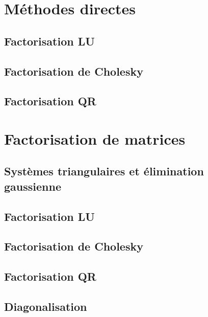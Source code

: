\section{Méthodes directes}

\subsection{Factorisation LU}

\subsection{Factorisation de Cholesky}

\subsection{Factorisation QR}



\clearpage
\section{Factorisation de matrices}

\subsection{Systèmes triangulaires et élimination gaussienne}

\subsection{Factorisation LU}

\subsection{Factorisation de Cholesky}

\subsection{Factorisation QR}


\subsection{Diagonalisation}

